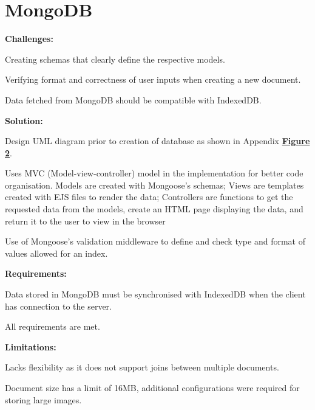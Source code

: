 \documentclass[11pt, a4paper]{article}
\begin{document}
\section{MongoDB}
\textbf{Challenges:}
\begin{enumerate*}[label=\textbf{\arabic*})]
\item Creating schemas that clearly define the respective models.
\item Verifying format and correctness of user inputs when creating a new document.
\item Data fetched from MongoDB should be compatible with IndexedDB.
\end{enumerate*}
%
\textbf{Solution:}
\begin{enumerate*}[label=\textbf{\arabic*})]
\item Design UML diagram prior to creation of database as shown in Appendix
\hyperref[figure:uml]{\textbf{Figure 2}}.
\item Uses MVC (Model-view-controller) model in the implementation for better code organisation.
Models are created with Mongoose's schemas; Views are templates created with EJS files to render the
data; Controllers are functions to get the requested data from the models, create an HTML page
displaying the data, and return it to the user to view in the browser
\item Use of Mongoose's validation middleware \cite{validation} to define and check type and format
of values allowed for an index.
\end{enumerate*}
%
\textbf{Requirements:}
\begin{enumerate*}[label=\textbf{\arabic*})]
\item Data stored in MongoDB must be synchronised with IndexedDB when the client has connection to
the server.
\item All requirements are met.
\end{enumerate*}
%
\textbf{Limitations:}
\begin{enumerate*}[label=\textbf{\arabic*})]
\item Lacks flexibility as it does not support joins between multiple documents.
\item Document size has a limit of 16MB, additional configurations were required for storing large
images.
\end{enumerate*}
\end{document}
